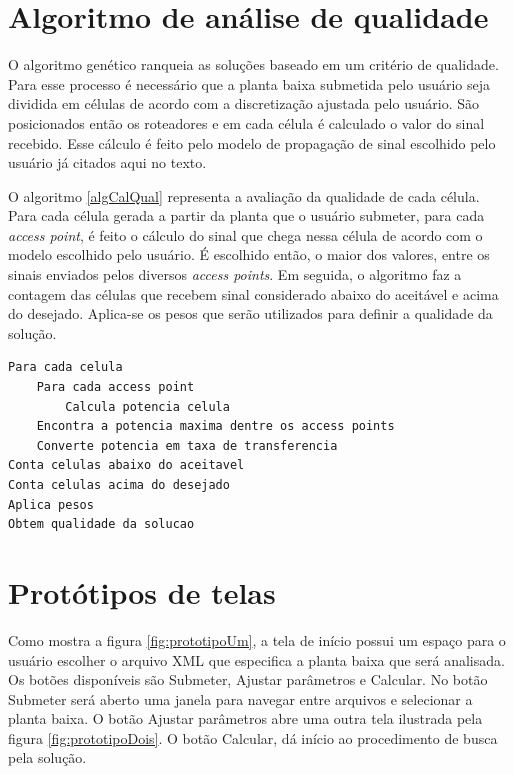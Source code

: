 \documentclass[tc,twoside]{iiufrgs}
\begin{document}
\section{Algoritmo de análise de qualidade}

O algoritmo genético ranqueia as soluções baseado em um critério de qualidade. Para esse processo é necessário que a planta baixa submetida pelo usuário seja dividida em células de acordo com a discretização ajustada pelo usuário. São posicionados então os roteadores e em cada célula é calculado o valor do sinal recebido. Esse cálculo é feito pelo modelo de propagação de sinal escolhido pelo usuário já citados aqui no texto. %
 
O algoritmo \ref{algCalQual} representa a avaliação da qualidade de cada célula. Para cada célula gerada a partir da planta que o usuário submeter, para cada \textit{access point}, é feito o cálculo do sinal que chega nessa célula de acordo com o modelo escolhido pelo usuário. É escolhido então, o maior dos valores, entre os sinais enviados pelos diversos \textit{access points}. Em seguida, o algoritmo faz a contagem das células que recebem sinal considerado abaixo do aceitável e acima do desejado. Aplica-se os pesos que serão utilizados para definir a qualidade da solução.     

\begin{lstlisting}[caption=Algoritmo cálculo da qualidade canônico, label=algCalQual]
Para cada celula
	Para cada access point
		Calcula potencia celula
	Encontra a potencia maxima dentre os access points
	Converte potencia em taxa de transferencia
Conta celulas abaixo do aceitavel
Conta celulas acima do desejado
Aplica pesos
Obtem qualidade da solucao
\end{lstlisting}

\section{Protótipos de telas}

Como mostra a figura \ref{fig:prototipoUm}, a tela de início possui um espaço para o usuário escolher o arquivo XML que especifica a planta baixa que será analisada. Os botões disponíveis são Submeter, Ajustar parâmetros e Calcular. 
No botão Submeter será aberto uma janela para navegar entre arquivos e selecionar a planta baixa. O botão Ajustar parâmetros abre uma outra tela ilustrada pela figura \ref{fig:prototipoDois}. O botão Calcular, dá início ao procedimento de busca pela solução.
\end{document}
